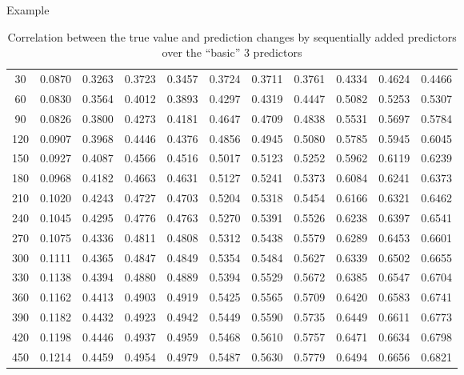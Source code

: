 \documentclass{beamer}
\begin{document}
\begin{frame}{Example}
\begin{table}[h!]
{\begin{tabular}{||c c c c c c c c c c c||}
        30 & 0.0870 & 0.3263 & 0.3723 & 0.3457 & 0.3724 & 0.3711 & 0.3761 & 0.4334 & 0.4624 & 0.4466 \\ 
        60 & 0.0830 & 0.3564 & 0.4012 & 0.3893 & 0.4297 & 0.4319 & 0.4447 & 0.5082 & 0.5253 & 0.5307 \\ 
        90 & 0.0826 & 0.3800 & 0.4273 & 0.4181 & 0.4647 & 0.4709 & 0.4838 & 0.5531 & 0.5697 & 0.5784 \\ 
        120 & 0.0907 & 0.3968 & 0.4446 & 0.4376 & 0.4856 & 0.4945 & 0.5080 & 0.5785 & 0.5945 & 0.6045 \\ 
        150 & 0.0927 & 0.4087 & 0.4566 & 0.4516 & 0.5017 & 0.5123 & 0.5252 & 0.5962 & 0.6119 & 0.6239 \\ 
        180 & 0.0968 & 0.4182 & 0.4663 & 0.4631 & 0.5127 & 0.5241 & 0.5373 & 0.6084 & 0.6241 & 0.6373 \\ 
        210 & 0.1020 & 0.4243 & 0.4727 & 0.4703 & 0.5204 & 0.5318 & 0.5454 & 0.6166 & 0.6321 & 0.6462 \\ 
        240 & 0.1045 & 0.4295 & 0.4776 & 0.4763 & 0.5270 & 0.5391 & 0.5526 & 0.6238 & 0.6397 & 0.6541 \\ 
        270 & 0.1075 & 0.4336 & 0.4811 & 0.4808 & 0.5312 & 0.5438 & 0.5579 & 0.6289 & 0.6453 & 0.6601 \\ 
        300 & 0.1111 & 0.4365 & 0.4847 & 0.4849 & 0.5354 & 0.5484 & 0.5627 & 0.6339 & 0.6502 & 0.6655 \\ 
        330 & 0.1138 & 0.4394 & 0.4880 & 0.4889 & 0.5394 & 0.5529 & 0.5672 & 0.6385 & 0.6547 & 0.6704 \\ 
        360 & 0.1162 & 0.4413 & 0.4903 & 0.4919 & 0.5425 & 0.5565 & 0.5709 & 0.6420 & 0.6583 & 0.6741 \\ 
        390 & 0.1182 & 0.4432 & 0.4923 & 0.4942 & 0.5449 & 0.5590 & 0.5735 & 0.6449 & 0.6611 & 0.6773 \\ 
        420 & 0.1198 & 0.4446 & 0.4937 & 0.4959 & 0.5468 & 0.5610 & 0.5757 & 0.6471 & 0.6634 & 0.6798 \\ 
        450 & 0.1214 & 0.4459 & 0.4954 & 0.4979 & 0.5487 & 0.5630 & 0.5779 & 0.6494 & 0.6656 & 0.6821 \\ 
         \hline\hline
\end{tabular}}
\caption{Correlation between the true value and prediction changes by sequentially added predictors over the “basic” 3 predictors}
\label{table:Corr}
\end{table}
\end{frame}
\end{document}
